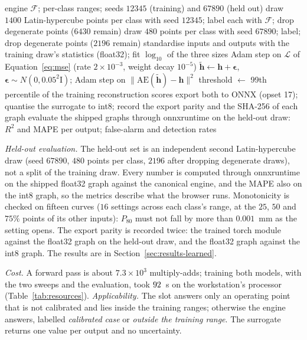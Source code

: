 \begin{algorithm}[!t]
\caption{Training, export and held-out evaluation of the two learned models (\texttt{stages/\allowbreak{}train.py}, \texttt{stages/\allowbreak{}evaluate.py}).}
\label{alg:surrogate}
\begin{algorithmic}[1]
\Require engine $\mathcal F$; per-class ranges; seeds $12345$ (training) and $67890$ (held out)
\State draw $1400$ Latin-hypercube points per class with seed $12345$; label each with $\mathcal F$; drop degenerate points ($6430$ remain)
\State draw $480$ points per class with seed $67890$; label; drop degenerate points ($2196$ remain)
\State standardise inputs and outputs with the training draw's statistics (float32); fit $\log_{10}$ of the three sizes
 
  \State Adam step on $\mathcal L$ of Equation~\eqref{eq:mse} (rate $2\times10^{-3}$, weight decay $10^{-5}$)
\EndFor
{} 
  \State $\tilde{\mathbf h}\gets\mathbf h+\boldsymbol\epsilon$, $\boldsymbol\epsilon\sim N(0,0.05^2\mathrm I)$; Adam step on $\|\mathrm{AE}(\tilde{\mathbf h})-\mathbf h\|^2$
\EndFor
\State threshold $\gets$ 99th percentile of the training reconstruction scores
\State export both to ONNX (opset 17); quantise the surrogate to int8; record the export parity and the SHA-256 of each graph
\State evaluate the shipped graphs through onnxruntime on the held-out draw: $R^2$ and MAPE per output; false-alarm and detection rates
\end{algorithmic}
\end{algorithm}

\emph{Held-out evaluation.} The held-out set is an independent second Latin-hypercube draw (seed $67890$, $480$ points per class, $2196$
after dropping degenerate draws), not a split of the training draw. Every number is computed through onnxruntime on the shipped float32 graph
against the canonical engine, and the MAPE also on the int8 graph, so the metrics describe what the browser runs. Monotonicity is checked on
fifteen curves ($16$ settings across each class's range, at the $25$, $50$ and $75\%$ points of its other inputs): $P_{80}$ must not fall by more
than $0.001$~mm as the setting opens. The export parity is recorded twice: the trained torch module against the float32 graph on the held-out
draw, and the float32 graph against the int8 graph. The results are in Section~\ref{sec:results-learned}.

\emph{Cost.} A forward pass is about $7.3\times10^{3}$ multiply-adds; training both models, with the two sweeps and the evaluation, took $92$~s on
the workstation's processor (Table~\ref{tab:resources}). \emph{Applicability.} The slot answers only an operating point that is not calibrated and lies inside the training
ranges; otherwise the engine answers, labelled \emph{calibrated case} or \emph{outside the training range}. The surrogate returns one value per
output and no uncertainty.

